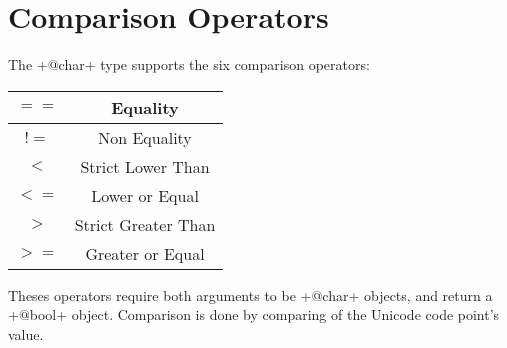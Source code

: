 \section{Comparison Operators}

The \ggs+@char+ type supports the six comparison operators:\newline

\begin{tabular}{|c|c|}
\hline
$==$ & Equality \\
\hline
$!=$ & Non Equality \\
\hline
$<$  & Strict Lower Than \\
\hline
$<=$  & Lower or Equal \\
\hline
$>$  & Strict Greater Than \\
\hline
$>=$  & Greater or Equal \\
\hline
\end{tabular}

Theses operators require both arguments to be \ggs+@char+ objects, and return a \ggs+@bool+ object. Comparison is done by comparing of the Unicode code point's value.


